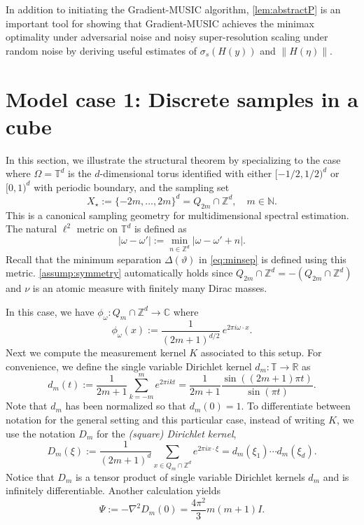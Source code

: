 \documentclass[11pt]{article}
\theoremstyle{definition}
\numberwithin{theorem}{section}
\numberwithin{lemma}{section}
\numberwithin{equation}{section}
\def\C{\mathbb{C}}
\def\N{\mathbb{N}}
\def\R{\mathbb{R}}
\def\T{\mathbb{T}}
\def\Z{\mathbb{Z}}
\newcommand{\domain}{\Omega}
\newcommand{\sampset}{X}
\numberwithin{equation}{section}
\begin{document}
In addition to initiating the Gradient-MUSIC algorithm, \cref{lem:abstractP} is an important tool  for showing that Gradient-MUSIC achieves the minimax optimality under adversarial noise and noisy super-resolution scaling under random noise by deriving useful estimates of $\sigma_s(H(y))$ and $\|H(\eta)\|$. 


\section{Model case 1: Discrete samples in a cube}
\label{sec:example1}
\label{sec:exam1}

In this section, we illustrate the structural theorem by specializing  to the case where $\domain=\T^d$ is the $d$-dimensional torus identified with either $[-1/2,1/2)^d$ or $[0,1)^d$ with periodic boundary, and 
	the sampling set 
\[
	\sampset_\star := \{-2m,\dots,2m\}^d = Q_{2m}\cap \Z^d,\quad m \in \N.
	\]
	This is a canonical sampling geometry for multidimensional spectral estimation. 
The natural $\ell^2$ metric on $\T^d$ is defined as 
	$$
	|\omega-\omega'|:=\min_{n\in \Z^d} |\omega-\omega'+n|.
	$$
	Recall that the minimum separation $\Delta(\vartheta)$ in \eqref{eq:minsep} is defined using this metric. 
	\cref{assump:symmetry} automatically holds since $Q_{2m}\cap\Z^d = -(Q_{2m}\cap\Z^d)$ and $\nu$ is an atomic measure with finitely many Dirac masses. 
		
	In this case, we have $\phi_\omega\colon Q_m\cap\Z^d\to \C$ where
	$$
	\phi_\omega(x)
	:=\frac 1 {(2m+1)^{d/2}} \, e^{2\pi i \omega\cdot x}.
	$$
	Next we compute the measurement kernel $K$ associated to this setup. For convenience, we define the single variable Dirichlet kernel $d_m\colon \T\to \R$ as
	\begin{equation}
		\label{eq:dirichlet}
		d_m(t)
		:=\frac 1 {2m+1} \sum_{k=-m}^m e^{2\pi i  kt}
		= \frac 1 {2m+1}\frac{\sin ((2m+1)\pi t)}{\sin(\pi t)}.
	\end{equation}
	Note that $d_m$ has been normalized so that $d_m(0)=1$. To differentiate between notation for the general setting and this particular case, instead of writing $K$, we use the notation $D_m$ for the {\it (square) Dirichlet kernel}, 
	\begin{equation}
		\label{eq:squareDirichlet}
		D_m(\xi)
		:=\frac 1 {(2m+1)^d} \sum_{x\in Q_m\cap \Z^d} e^{2\pi i x\cdot \xi}
		= d_m(\xi_1)\cdots d_m(\xi_d).
	\end{equation}
	Notice that $D_m$ is a tensor product of single variable Dirichlet kernels $d_m$ and is infinitely differentiable.  Another calculation yields
	\begin{equation}\label{eq:hessian1}
		\Psi
		:=-\nabla^2 D_m(0)
		=\frac {4\pi^2}3 m(m+1) I. 
	\end{equation}
\end{document}
